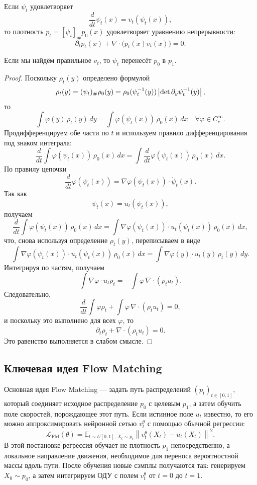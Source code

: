 \begin{proposition}
    Если $\psi_t$ удовлетворяет
    \[
    \frac{d}{dt}\psi_t(x) = v_t(\psi_t(x)),
    \]
    то плотность $p_t = [\psi_t]_\# p_0 (x)$ удовлетворяет уравнению непрерывности:
    \[
    \partial_t p_t(x) + \nabla \cdot \big(p_t(x) v_t(x)\big) = 0.
    \]
\end{proposition}
Если мы найдём правильное $v_t$, то $\psi_t$ перенесёт $p_0$ в $p_1$.
\begin{proof}
    Поскольку $\rho_t(y)$ определено формулой
    \[
    \rho_t(y) = (\psi_t)_\# \rho_0(y) = \rho_0(\psi_t^{-1}(y)) \left|\operatorname{det} \partial_y \psi_t^{-1}(y)\right|,
    \]
    то
    \[
    \int \varphi(y)\,\rho_t(y)\,dy = \int \varphi(\psi_t(x))\,\rho_0(x)\,dx \quad \forall \varphi \in C_c^\infty.
    \]
    Продифференцируем обе части по $t$ и используем правило дифференцирования под знаком интеграла:
    \[
    \frac{d}{dt} \int \varphi(\psi_t(x))\,\rho_0(x)\,dx = \int \frac{d}{dt}\varphi(\psi_t(x))\,\rho_0(x)\,dx.
    \]
    По правилу цепочки
    \[
    \frac{d}{dt}\varphi(\psi_t(x)) = \nabla \varphi(\psi_t(x)) \cdot \dot{\psi}_t(x).
    \]
    Так как
    \[
    \dot{\psi}_t(x) = u_t(\psi_t(x)),
    \]
    получаем
    \[
    \frac{d}{dt} \int \varphi(\psi_t(x))\,\rho_0(x)\,dx = \int \nabla \varphi(\psi_t(x)) \cdot u_t(\psi_t(x))\,\rho_0(x)\,dx,
    \]
    что, снова используя определение $\rho_t(y)$, переписываем в виде
    \[
    \int \nabla \varphi(\psi_t(x)) \cdot u_t(\psi_t(x))\,\rho_0(x)\,dx = \int \nabla \varphi(y) \cdot u_t(y)\,\rho_t(y)\,dy.
    \]
    Интегрируя по частям, получаем
    \[
    \int \nabla \varphi \cdot u_t \rho_t = - \int \varphi \, \nabla \cdot (\rho_t u_t).
    \]
    Следовательно,
    \[
    \frac{d}{dt} \int \varphi \rho_t + \int \varphi \, \nabla \cdot (\rho_t u_t) = 0,
    \]
    и поскольку это выполнено для всех $\varphi$, то
    \[
    \partial_t \rho_t + \nabla \cdot (\rho_t u_t) = 0.
    \]
    Это равенство выполняется в слабом смысле.
\end{proof}

\subsection{Ключевая идея Flow Matching}
Основная идея Flow Matching --- задать путь распределений $(p_t)_{t\in[0,1]}$,
который соединяет исходное распределение $p_0$ с целевым $p_1$, а затем
обучить поле скоростей, порождающее этот путь. Если истинное поле $u_t$
известно, то его можно аппроксимировать нейронной сетью $v_t^\theta$ с помощью
обычной регрессии:
\[
\mathcal L_{\text{FM}}(\theta) =
\mathbb E_{t\sim U[0,1],\,X_t\sim p_t}
\left\|v_t^\theta(X_t)-u_t(X_t)\right\|^2.
\]
В этой постановке регрессия обучает не плотность $p_1$ непосредственно, а
локальное направление движения, необходимое для переноса вероятностной
массы вдоль пути. После обучения новые сэмплы получаются так: генерируем
$X_0\sim p_0$, а затем интегрируем ОДУ с полем $v_t^\theta$ от $t=0$ до $t=1$.


